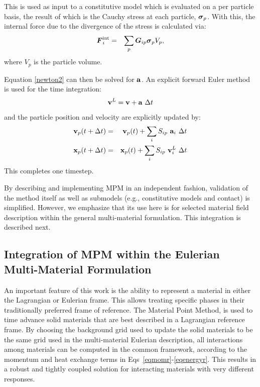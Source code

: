 This is used as input to a constitutive model which is evaluated on a
per particle basis, the result of which is the Cauchy stress at each
particle, $\boldsymbol{\sigma}_p$.  With this, the internal force due to the divergence
of the stress is calculated via:
\begin{eqnarray}
        \boldsymbol{F}^{\text{int}}_i &=& \sum_{p} \boldsymbol{G}_{ip} \boldsymbol{\sigma}_p V_p,
\end{eqnarray}
where $V_p$ is the particle volume.

Equation \ref{newton2} can then be solved for $\mathbf{a}$.
An explicit forward Euler method is used for the time integration:
\begin{eqnarray}
\mathbf{v}^L= \mathbf{v} + \mathbf{a}~\Delta t
\label{MPM:euler}
\end{eqnarray}
and the particle position and velocity are explicitly updated by:
\begin{eqnarray}
  \mathbf{v}_p (t + \Delta t)  &=& \mathbf{v}_p (t)  + \sum_{i} S_{ip} ~\mathbf{a}_i  ~\Delta t 
  \label{MPM:updateVp} \\
  \mathbf{x}_p (t + \Delta t)  &=& \mathbf{x}_p (t)  + \sum_{i} S_{ip} ~\mathbf{v}^L_i  ~\Delta t 
  \label{MPM:updateXp}
\end{eqnarray}
This completes one timestep.

By describing and implementing MPM in an independent fashion, validation of 
the method itself as well as submodels (e.g., constitutive models and contact)
is simplified.  However, we emphasize that its use here is for selected 
material field description within the general multi-material formulation.  This 
integration is described next.

\subsection{Integration of MPM within the Eulerian Multi-Material 
            Formulation}\label{sec:coupling}

An important feature of this work is the ability to represent a material in 
either the Lagrangian or Eulerian frame.  This allows treating specific phases 
in their traditionally preferred frame of reference.
The Material Point Method, is used to time 
advance solid materials that are best described in a Lagrangian reference frame.
By choosing the background grid used to update the solid materials to
be the same grid used in the multi-material Eulerian description,
all interactions among materials can be computed in the common
framework, according to the momentum and heat exchange terms in 
Eqs~\ref{eqmomr}-\ref{eqenergyr}.  This results in a robust and tightly 
coupled solution for interacting materials with very different responses.


